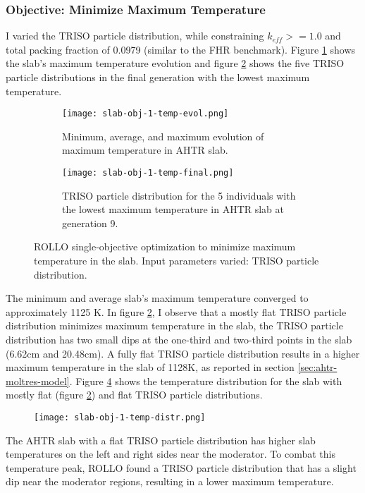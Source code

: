 \subsubsection{Objective: Minimize Maximum Temperature}
I varied the TRISO particle distribution, while constraining $k_{eff} >= 1.0$ and 
total packing fraction of 0.0979 (similar to the FHR benchmark). 
Figure \ref{fig:slab-obj-1-temp-evol} shows the slab's maximum temperature evolution 
and figure \ref{fig:slab-obj-1-temp-final} shows the five TRISO particle 
distributions in the final generation with the lowest maximum temperature.
\begin{figure}[]
    \centering
    \begin{subfigure}{\textwidth}
        \texttt{[image: slab-obj-1-temp-evol.png]}
        \caption{Minimum, average, and maximum evolution of maximum temperature in 
        AHTR slab.}
        \label{fig:slab-obj-1-temp-evol} 
    \end{subfigure}
    \begin{subfigure}{\textwidth}
        \texttt{[image: slab-obj-1-temp-final.png]}
        \caption{TRISO particle distribution for the 5 individuals with the 
        lowest maximum temperature in AHTR slab at generation 9.}
        \label{fig:slab-obj-1-temp-final} 
    \end{subfigure}
    \caption{ROLLO single-objective optimization to minimize maximum temperature 
    in the slab. Input parameters varied: TRISO particle distribution.}
    \label{fig:slab-obj-1-temp}
\end{figure}
The minimum and average slab's maximum temperature converged to approximately 
1125 K. 
In figure \ref{fig:slab-obj-1-temp-final}, I observe that a mostly flat TRISO 
particle distribution minimizes maximum temperature in the slab, 
the TRISO particle distribution has two small dips at the one-third and two-third 
points in the slab (6.62cm and 20.48cm). 
A fully flat TRISO particle distribution results in a higher maximum temperature in 
the slab of 1128K, as reported in section \ref{sec:ahtr-moltres-model}. 
Figure \ref{fig:slab-obj-1-temp-distr} shows the temperature distribution 
for the slab with mostly flat (figure \ref{fig:slab-obj-1-temp-final}) and 
flat TRISO particle distributions.
\begin{figure}[H]
    \centering
    \texttt{[image: slab-obj-1-temp-distr.png]}
    \caption{}
    \label{fig:slab-obj-1-temp-distr}
\end{figure}
The AHTR slab with a flat TRISO particle distribution has higher slab temperatures 
on the left and right sides near the moderator. 
To combat this temperature peak, ROLLO found a TRISO particle distribution that 
has a slight dip near the moderator regions, resulting in a lower maximum 
temperature.  

